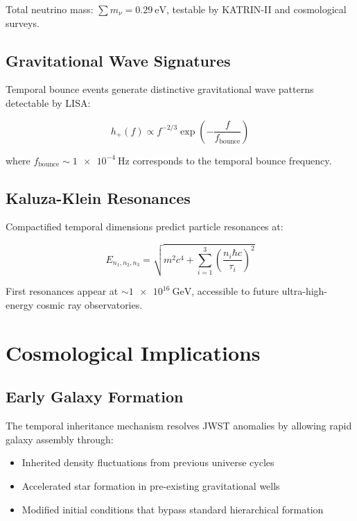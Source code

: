 \documentclass[reprint,amsmath,amssymb,aps,prd,nofootinbib]{revtex4-2}
\begin{document}
Total neutrino mass: $\sum m_\nu = \SI{0.29}{\electronvolt}$, testable by KATRIN-II and cosmological surveys.

\subsection{Gravitational Wave Signatures}

Temporal bounce events generate distinctive gravitational wave patterns detectable by LISA:

\begin{equation}
h_+(f) \propto f^{-2/3} \exp\left(-\frac{f}{f_{\text{bounce}}}\right)
\label{eq:gw_signature}
\end{equation}

where $f_{\text{bounce}} \sim \SI{1e-4}{\hertz}$ corresponds to the temporal bounce frequency.

\subsection{Kaluza-Klein Resonances}

Compactified temporal dimensions predict particle resonances at:

\begin{equation}
E_{n_1,n_2,n_3} = \sqrt{m^2c^4 + \sum_{i=1}^{3}\left(\frac{n_i\hbar c}{\tau_i}\right)^2}
\label{eq:kk_resonances}
\end{equation}

First resonances appear at $\sim\SI{1e16}{\giga\electronvolt}$, accessible to future ultra-high-energy cosmic ray observatories.

\section{Cosmological Implications}\label{sec:cosmology}

\subsection{Early Galaxy Formation}

The temporal inheritance mechanism resolves JWST anomalies by allowing rapid galaxy assembly through:

\begin{itemize}
\item Inherited density fluctuations from previous universe cycles
\item Accelerated star formation in pre-existing gravitational wells
\item Modified initial conditions that bypass standard hierarchical formation
\end{itemize}
\end{document}
